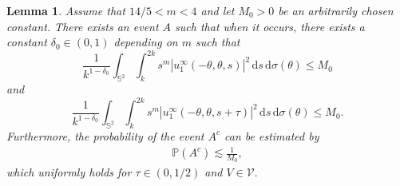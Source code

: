 \documentclass[reqno, 12pt]{amsart}
\newtheorem{Le}{Lemma}[section]
\numberwithin{equation}{section}
\begin{document}
\begin{Le}\label{firstorder} Assume that $14/5<m<4$ and let $M_0>0$ be an arbitrarily chosen constant. There exists an event $A$ such that when it occurs, there exists a constant $\delta_0 \in (0,1)$ depending on $m$ such that
     \begin{equation}\label{5.3}
	\frac{1}{k^{1-\delta_0}}\int_{\mathbb S^2}\int_k^{2k}s^m|u^\infty_1(-\theta,\theta,s)|^2\,\mathrm{d}s\,\mathrm{d}\sigma(\theta) \le M_0
\end{equation}  and 
     \begin{equation}\label{5.3'}
	\frac{1}{k^{1-\delta_0}}\int_{\mathbb S^2}\int_k^{2k}s^m|u^\infty_1(-\theta,\theta,s+\tau)|^2\,\mathrm{d}s\,\mathrm{d}\sigma(\theta) \le M_0.
\end{equation} Furthermore, the probability of the event $A^c$ can be estimated by \begin{align}\label{evea}
    \mathbb P(A^c) \lesssim \frac{1}{M_0},
\end{align} which  uniformly holds for $\tau \in (0,1/2)$ and $V \in \mathcal V.$
 \end{Le}  
\end{document}
